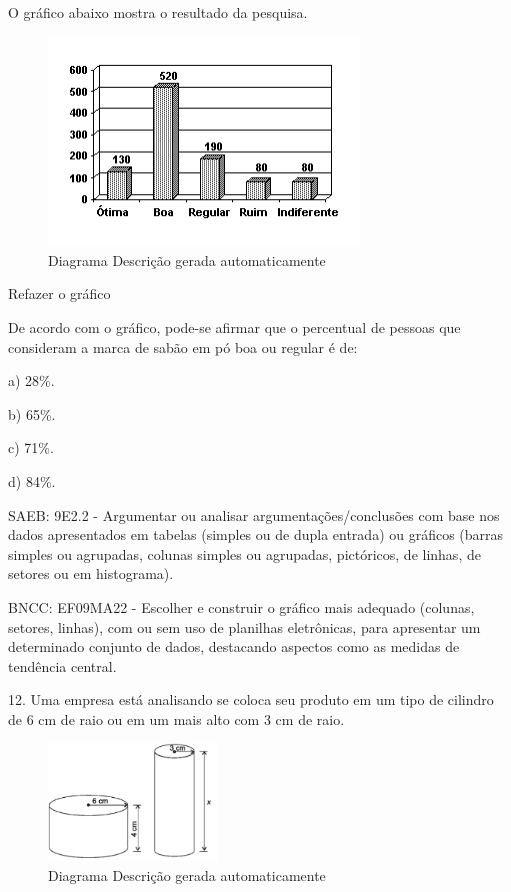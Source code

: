 \begin{escolha}
{{{\begin{escolha}
{{{{{\begin{escolha}
\begin{escolha}
{\begin{q°}
O gráfico abaixo mostra o resultado da pesquisa.

\begin{figure}
\centering
\includegraphics[width=3.25in,height=2.18333in]{./_SAEB_9_MAT/media/image279.png}
\caption{Diagrama Descrição gerada automaticamente}
\end{figure}

Refazer o gráfico

De acordo com o gráfico, pode-se afirmar que o percentual de pessoas que
consideram a marca de sabão em pó boa ou regular é de:

a) 28\%.

b) 65\%.

c) 71\%.

d) 84\%.

SAEB: 9E2.2 - Argumentar ou analisar argumentações/conclusões com base
nos dados apresentados em tabelas (simples ou de dupla entrada) ou
gráficos (barras simples ou agrupadas, colunas simples ou agrupadas,
pictóricos, de linhas, de setores ou em histograma).

BNCC: EF09MA22 - Escolher e construir o gráfico mais adequado (colunas,
setores, linhas), com ou sem uso de planilhas eletrônicas, para
apresentar um determinado conjunto de dados, destacando aspectos como as
medidas de tendência central.

12. Uma empresa está analisando se coloca seu produto em um tipo de
cilindro de 6 cm de raio ou em um mais alto com 3 cm de raio.

\begin{figure}
\centering
\includegraphics[width=1.77016in,height=1.22917in]{./_SAEB_9_MAT/media/image280.png}
\caption{Diagrama Descrição gerada automaticamente}
\end{figure}


\end{q°}}
\end{escolha}
\end{escolha}}}}}}
\end{escolha}}}}
\end{escolha}
